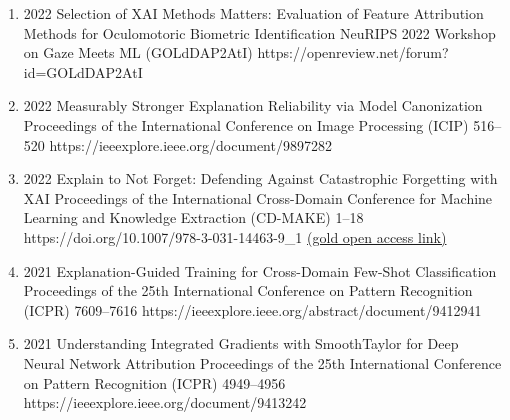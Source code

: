 {\begin{enumerate}
        \item {}
                            {2022}
                            {Selection of XAI Methods Matters: Evaluation of Feature Attribution Methods for Oculomotoric Biometric Identification}
                            {NeuRIPS 2022 Workshop on Gaze Meets ML}
                            {(GOLdDAP2AtI)}
                            {https://openreview.net/forum?id=GOLdDAP2AtI} 


        \item {}
                            {2022}
                            {Measurably Stronger Explanation Reliability via Model Canonization}
                            {Proceedings of the International Conference on Image Processing (ICIP)}
                            {516--520}
                            {https://ieeexplore.ieee.org/document/9897282}

        \item {}
                            {2022}
                            {Explain to Not Forget: Defending Against Catastrophic Forgetting with XAI}
                            {Proceedings of the International Cross-Domain Conference for Machine Learning and Knowledge Extraction (CD-MAKE)}
                            {1--18}
                            {https://doi.org/10.1007/978-3-031-14463-9_1}
                            {\href{https://link.springer.com/content/pdf/10.1007/978-3-031-04083-2.pdf}{(gold open access link)}} %

        \item {}
                                {2021}
                                {Explanation-Guided Training for Cross-Domain Few-Shot Classification}
                                {Proceedings of the 25th International Conference on Pattern Recognition (ICPR)}
                                {7609--7616}
                                {https://ieeexplore.ieee.org/abstract/document/9412941}

        \item {}
                                {2021}
                                {Understanding Integrated Gradients with SmoothTaylor for Deep Neural Network Attribution}
                                {Proceedings of the 25th International Conference on Pattern Recognition (ICPR)}
                                {4949--4956}
                                {https://ieeexplore.ieee.org/document/9413242}


\end{enumerate}}
